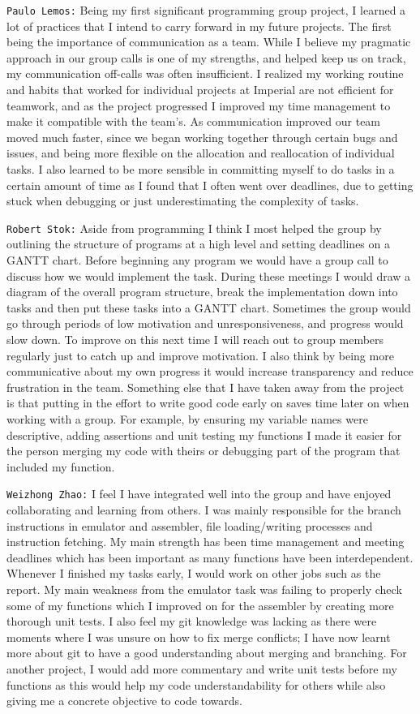 \documentclass[11pt]{article}
\begin{document}
\texttt{Paulo Lemos:} Being my first significant programming group project, I learned a lot of practices that I intend to carry forward in my future projects. The first being the importance of communication as a team. While I believe my pragmatic approach in our group calls is one of my strengths, and helped keep us on track, my communication off-calls was often insufficient. I realized my working routine and habits that worked for individual projects at Imperial are not efficient for teamwork, and as the project progressed I improved my time management to make it compatible with the team’s. As communication improved our team moved much faster, since we began working together through certain bugs and issues, and being more flexible on the allocation and reallocation of individual tasks. I also learned to be more sensible in committing myself to do tasks in a certain amount of time as I found that I often went over deadlines, due to getting stuck when debugging or just underestimating the complexity of tasks. 

\texttt{Robert Stok:} Aside from programming I think I most helped the group by outlining the structure of programs at a high level and setting deadlines on a GANTT chart. Before beginning any program we would have a group call to discuss how we would implement the task. During these meetings I would draw a diagram of the overall program structure, break the implementation down into tasks and then put these tasks into a GANTT chart. Sometimes the group would go through periods of low motivation and unresponsiveness, and progress would slow down. To improve on this next time I will reach out to group members regularly just to catch up and improve motivation. I also think by being more communicative about my own progress it would increase transparency and reduce frustration in the team. Something else that I have taken away from the project is that putting in the effort to write good code early on saves time later on when working with a group. For example, by ensuring my variable names were descriptive, adding assertions and unit testing my functions I made it easier for the person merging my code with theirs or debugging part of the program that included my function.
 

\texttt{Weizhong Zhao:} I feel I have integrated well into the group and have enjoyed collaborating and learning from others. I was mainly responsible for the branch instructions in emulator and assembler, file loading/writing processes and instruction fetching. My main strength has been time management and meeting deadlines which has been important as many functions have been interdependent. Whenever I finished my tasks early, I would work on other jobs such as the report. My main weakness from the emulator task was failing to properly check some of my functions which I improved on for the assembler by creating more thorough unit tests. I also feel my git knowledge was lacking as there were moments where I was unsure on how to fix merge conflicts; I have now learnt more about git to have a good understanding about merging and branching. For another project, I would add more commentary and write unit tests before my functions as this would help my code understandability for others while also giving me a concrete objective to code towards.
\end{document}
